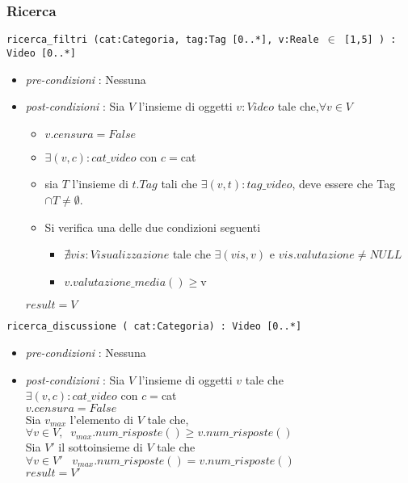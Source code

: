 \documentclass[12pt, letterpaper]{article}
\newcommand{\code}[1]{\colorbox{light-gray}{\texttt{#1}}}
\newcommand{\id}{{\hphantom{ident}}}
\begin{document}
\subsubsection{Ricerca}
\code{ricerca\_filtri (cat:Categoria, tag:Tag [0..*], v:Reale $\in$ [1,5] ) : Video [0..*]}\begin{itemize}
\item\textit{pre-condizioni} : Nessuna
\item \textit{post-condizioni} : Sia $V$ l'insieme di oggetti $v:Video$ tale che,$\forall v\in V$\begin{itemize}
    \item $v.censura=False$
    \item $\exists (v,c):cat\_video$ con $c=$cat 
    \item sia $T$ l'insieme di $t.Tag$ tali che $\exists (v,t):tag\_video$, deve essere che Tag$\cap T\ne \emptyset$.
    \item Si verifica una delle due condizioni seguenti\begin{itemize}
        \item $\nexists vis:Visualizzazione$ tale che $\exists(vis,v)$ e $vis.valutazione\ne NULL$ 
        \item $v.valutazione\_media()\ge $v
    \end{itemize}
\end{itemize}
$result=V$
\end{itemize}
\code{ricerca\_discussione ( cat:Categoria) : Video [0..*]}\begin{itemize}
    \item \textit{pre-condizioni} : Nessuna
    \item \textit{post-condizioni} : Sia $V$ l'insieme di oggetti $v$ tale che\\ 
    \id  $\exists (v,c):cat\_video$ con $c=$cat \\
    \id $v.censura=False$\\
    Sia $v_{max}$ l'elemento di $V$ tale che, $\forall v\in V,\;\;v_{max}.num\_risposte()\ge v.num\_risposte()$\\
    Sia $V'$ il sottoinsieme di $V$ tale che $\forall v\in V'\;\;\;v_{max}.num\_risposte()= v.num\_risposte()$\\
    $result=V'$ 
\end{itemize}
\end{document}

